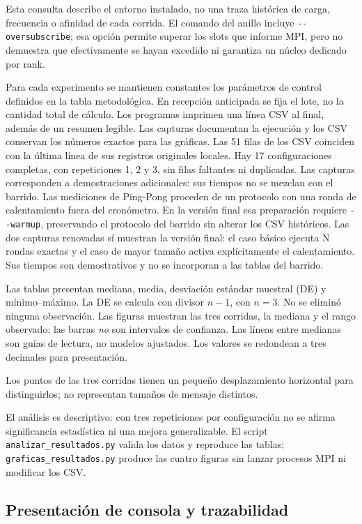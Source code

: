 \documentclass[11pt,letterpaper]{article}
\newcommand{\subheading}[1]{\subsection{\textcolor{azul}{#1}}}
\begin{document}
Esta consulta describe el entorno instalado, no una traza histórica de
carga, frecuencia o afinidad de cada corrida. El comando del anillo incluye
\texttt{-{}-oversubscribe}; esa opción permite superar los slots que informe
MPI, pero no demuestra que efectivamente se hayan excedido ni garantiza
un núcleo dedicado por rank.

Para cada experimento se mantienen constantes los parámetros de control
definidos en la tabla metodológica. En recepción anticipada se fija el
lote, no la cantidad total de cálculo. Los programas imprimen una línea CSV
al final, además de un resumen legible. Las capturas documentan la
ejecución y los CSV conservan los números exactos para las gráficas.
Las 51 filas de los CSV coinciden con la última línea de sus registros
originales locales. Hay 17 configuraciones completas, con repeticiones
1, 2 y 3, sin filas faltantes ni duplicadas. Las capturas corresponden a
demostraciones adicionales: sus tiempos no se mezclan con el barrido.
Las mediciones de Ping-Pong proceden de un protocolo con una ronda de
calentamiento fuera del cronómetro. En la versión final esa preparación
requiere \texttt{-{}-warmup}, preservando el protocolo del barrido sin
alterar los CSV históricos. Las dos capturas renovadas sí muestran la
versión final: el caso básico ejecuta N rondas exactas y el caso de mayor
tamaño activa explícitamente el calentamiento. Sus tiempos son demostrativos
y no se incorporan a las tablas del barrido.

Las tablas presentan mediana, media, desviación estándar muestral (DE)
y mínimo--máximo. La DE se calcula con divisor $n-1$, con $n=3$. No se
eliminó ninguna observación. Las figuras muestran las tres corridas, la
mediana y el rango observado; las barras \emph{no} son intervalos de
confianza. Las líneas entre medianas son guías de lectura, no modelos
ajustados. Los valores se redondean a tres decimales para presentación.

Los puntos de las tres corridas tienen un pequeño desplazamiento
horizontal para distinguirlos; no representan tamaños de mensaje distintos.

El análisis es descriptivo: con tres repeticiones por configuración no
se afirma significancia estadística ni una mejora generalizable. El
script \texttt{analizar\_resultados.py} valida los datos y reproduce las
tablas; \texttt{graficas\_resultados.py} produce las cuatro figuras sin
lanzar procesos MPI ni modificar los CSV.

\subheading{Presentación de consola y trazabilidad}
\end{document}
